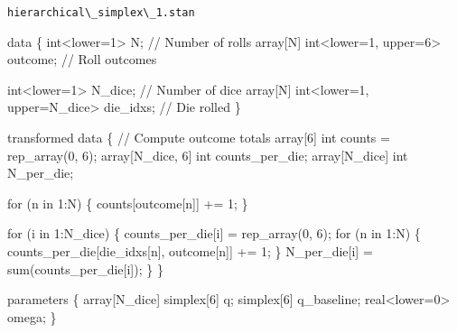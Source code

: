 \documentclass[
  letterpaper,
  DIV=11,
  numbers=noendperiod]{scrartcl}
\newenvironment{Shaded}{\begin{snugshade}}{\end{snugshade}}
\newcommand{\CommentTok}[1]{\textcolor[rgb]{0.37,0.37,0.37}{#1}}
\newcommand{\ControlFlowTok}[1]{\textcolor[rgb]{0.00,0.23,0.31}{#1}}
\newcommand{\DataTypeTok}[1]{\textcolor[rgb]{0.68,0.00,0.00}{#1}}
\newcommand{\DecValTok}[1]{\textcolor[rgb]{0.68,0.00,0.00}{#1}}
\newcommand{\KeywordTok}[1]{\textcolor[rgb]{0.00,0.23,0.31}{#1}}
\newcommand{\NormalTok}[1]{\textcolor[rgb]{0.00,0.23,0.31}{#1}}
\begin{document}
\begin{codelisting}

\caption{\texttt{hierarchical\textbackslash\_simplex\textbackslash\_1.stan}}

\begin{Shaded}
\begin{Highlighting}[]
\KeywordTok{data}\NormalTok{ \{}
  \DataTypeTok{int}\NormalTok{\textless{}}\KeywordTok{lower}\NormalTok{=}\DecValTok{1}\NormalTok{\textgreater{} N;                         }\CommentTok{// Number of rolls}
  \DataTypeTok{array}\NormalTok{[N] }\DataTypeTok{int}\NormalTok{\textless{}}\KeywordTok{lower}\NormalTok{=}\DecValTok{1}\NormalTok{, }\KeywordTok{upper}\NormalTok{=}\DecValTok{6}\NormalTok{\textgreater{} outcome; }\CommentTok{// Roll outcomes}

  \DataTypeTok{int}\NormalTok{\textless{}}\KeywordTok{lower}\NormalTok{=}\DecValTok{1}\NormalTok{\textgreater{} N\_dice;                          }\CommentTok{// Number of dice}
  \DataTypeTok{array}\NormalTok{[N] }\DataTypeTok{int}\NormalTok{\textless{}}\KeywordTok{lower}\NormalTok{=}\DecValTok{1}\NormalTok{, }\KeywordTok{upper}\NormalTok{=N\_dice\textgreater{} die\_idxs; }\CommentTok{// Die rolled}
\NormalTok{\}}

\KeywordTok{transformed data}\NormalTok{ \{}
  \CommentTok{// Compute outcome totals}
  \DataTypeTok{array}\NormalTok{[}\DecValTok{6}\NormalTok{] }\DataTypeTok{int}\NormalTok{ counts = rep\_array(}\DecValTok{0}\NormalTok{, }\DecValTok{6}\NormalTok{);}
  \DataTypeTok{array}\NormalTok{[N\_dice, }\DecValTok{6}\NormalTok{] }\DataTypeTok{int}\NormalTok{ counts\_per\_die;}
  \DataTypeTok{array}\NormalTok{[N\_dice] }\DataTypeTok{int}\NormalTok{ N\_per\_die;}

  \ControlFlowTok{for}\NormalTok{ (n }\ControlFlowTok{in} \DecValTok{1}\NormalTok{:N) \{}
\NormalTok{    counts[outcome[n]] += }\DecValTok{1}\NormalTok{;}
\NormalTok{  \}}

  \ControlFlowTok{for}\NormalTok{ (i }\ControlFlowTok{in} \DecValTok{1}\NormalTok{:N\_dice) \{}
\NormalTok{    counts\_per\_die[i] = rep\_array(}\DecValTok{0}\NormalTok{, }\DecValTok{6}\NormalTok{);}
    \ControlFlowTok{for}\NormalTok{ (n }\ControlFlowTok{in} \DecValTok{1}\NormalTok{:N) \{}
\NormalTok{      counts\_per\_die[die\_idxs[n], outcome[n]] += }\DecValTok{1}\NormalTok{;}
\NormalTok{    \}}
\NormalTok{    N\_per\_die[i] = sum(counts\_per\_die[i]);}
\NormalTok{  \}}
\NormalTok{\}}

\KeywordTok{parameters}\NormalTok{ \{}
  \DataTypeTok{array}\NormalTok{[N\_dice] }\DataTypeTok{simplex}\NormalTok{[}\DecValTok{6}\NormalTok{] q;}
  \DataTypeTok{simplex}\NormalTok{[}\DecValTok{6}\NormalTok{] q\_baseline;}
  \DataTypeTok{real}\NormalTok{\textless{}}\KeywordTok{lower}\NormalTok{=}\DecValTok{0}\NormalTok{\textgreater{} omega;}
\NormalTok{\}}


\end{Highlighting}
\end{Shaded}
\end{codelisting}
\end{document}
